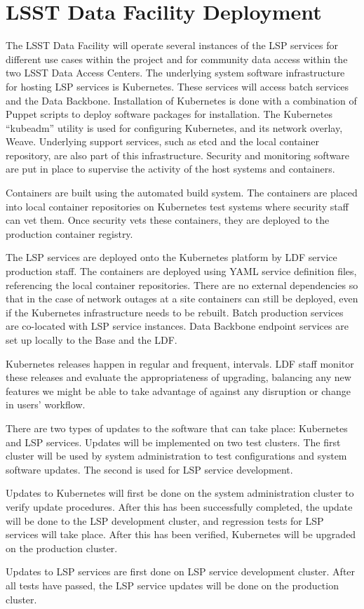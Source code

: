 \section{LSST Data Facility Deployment}\label{lsst-data-facility-deployment}

The LSST Data Facility will operate several instances of the LSP services for different use cases within the project and for community data access within the two LSST Data Access Centers. The underlying system software infrastructure for hosting LSP services is Kubernetes.  These services will access batch services and the Data Backbone. Installation of Kubernetes is done with a combination of Puppet scripts to deploy software packages for installation. The Kubernetes “kubeadm” utility is used for configuring Kubernetes, and its network overlay, Weave.  Underlying support services, such as etcd and the local container repository, are also part of this infrastructure.  Security and monitoring software are put in place to supervise the activity of the host systems and containers.

Containers are built using the automated build system.  The containers are placed into local container repositories on Kubernetes test systems where security staff can vet them.  Once security vets these containers, they are deployed to the production container registry.

The LSP services are deployed onto the Kubernetes platform by LDF service production staff.  The containers are deployed using YAML service definition files, referencing the local container repositories.   There are no external dependencies so that in the case of network outages at a site containers can still be deployed, even if the Kubernetes infrastructure needs to be rebuilt. Batch production services are co-located with LSP service instances. Data Backbone endpoint services are set up locally to the Base and the LDF.

Kubernetes releases happen in regular and frequent, intervals.  LDF staff monitor these releases and evaluate the appropriateness of upgrading, balancing any new features we might be able to take advantage of against any disruption or change in users’ workflow. 

There are two types of updates to the software that can take place:  Kubernetes and LSP services.  Updates will be implemented on two test clusters.   The first cluster will be used by system administration to test configurations and system software updates.  The second is used for LSP service development.     

Updates to Kubernetes will first be done on the system administration cluster to verify update procedures. After this has been successfully completed, the update will be done to the LSP development cluster, and regression tests for LSP services will take place.  After this has been verified,  Kubernetes will be upgraded on the production cluster.
 
Updates to LSP services are first done on LSP service development cluster. After all tests have passed, the LSP service updates will be done on the production cluster.

